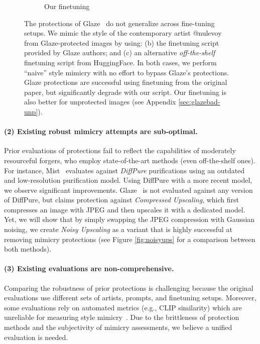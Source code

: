 \documentclass{article}
\begin{document}
\begin{figure}[]
\begin{subfigure}[b]{0.39\textwidth}
         \caption{Our finetuning}
     \end{subfigure}
     
\caption{The protections of Glaze~\citep{glaze} do not generalize across fine-tuning setups. We mimic the style of the contemporary artist @nulevoy from Glaze-protected images by using: (b) the finetuning script provided by Glaze authors; and (c) an alternative \emph{off-the-shelf} finetuning script from HuggingFace.
In both cases, we perform ``naive'' style mimicry with no effort to bypass Glaze's protections.
Glaze protections are successful using finetuning from the original paper, but significantly degrade with our script. Our finetuning is also better for unprotected images (see Appendix \ref{sec:glazebad-unp}).}
\label{fig:glazebad}
\end{figure}

\paragraph{(2) Existing robust mimicry attempts are sub-optimal.} Prior evaluations of protections fail to reflect the capabilities of moderately resourceful forgers, who employ state-of-the-art methods (even off-the-shelf ones). For instance, Mist~\citep{mist} evaluates  against \emph{DiffPure} purifications using an outdated and low-resolution purification model. Using DiffPure with a more recent model, we observe significant improvements. Glaze~\citep{glaze} is not evaluated against any version of DiffPure, but claims protection against \emph{Compressed Upscaling}, which first compresses an image with JPEG and then upscales it with a dedicated model. Yet, we will show that by simply swapping the JPEG compression with Gaussian noising, we create \emph{Noisy Upscaling} as a variant that is highly successful at removing mimicry protections  (see Figure \ref{fig:noisyups} for a comparison between both methods). 

\paragraph{(3) Existing evaluations are non-comprehensive.} Comparing the robustness of prior protections is challenging because the original evaluations use different sets of artists, prompts, and finetuning setups. Moreover, some evaluations rely on automated metrics (e.g., CLIP similarity) which are unreliable for measuring style mimicry~\citep{glaze,glazeresponsetoimpress}. Due to the brittleness of protection methods and the subjectivity of mimicry assessments, we believe a unified evaluation is needed.
\end{document}
